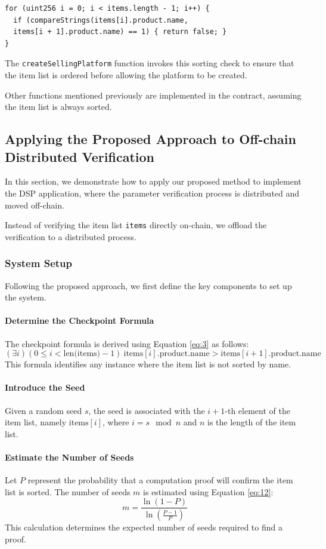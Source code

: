\documentclass[runningheads]{llncs}
\begin{document}
\begin{lstlisting}[numbers=none]
for (uint256 i = 0; i < items.length - 1; i++) {
  if (compareStrings(items[i].product.name, 
  items[i + 1].product.name) == 1) { return false; }
}
\end{lstlisting}

The \texttt{createSellingPlatform} function invokes this sorting check to ensure that the item list is ordered before allowing the platform to be created.

Other functions mentioned previously are implemented in the contract, assuming the item list is always sorted.
\subsection{Applying the Proposed Approach to Off-chain Distributed Verification}

In this section, we demonstrate how to apply our proposed method to implement the DSP application, where the parameter verification process is distributed and moved off-chain.

Instead of verifying the item list \texttt{items} directly on-chain, we offload the verification to a distributed process.

\subsubsection{System Setup}
Following the proposed approach, we first define the key components to set up the system.

\paragraph{Determine the Checkpoint Formula}
The checkpoint formula is derived using Equation \ref{eq:3} as follows:
\[
(\exists i) (0 \leq i < \text{len(items)} - 1) \ \text{items}[i].\text{product.name} > \text{items}[i+1].\text{product.name}
\]
This formula identifies any instance where the item list is not sorted by name.

\paragraph{Introduce the Seed}
Given a random seed \( s \), the seed is associated with the \( i+1 \)-th element of the item list, namely \( \text{items}[i] \), where \( i = s \mod n \) and \( n \) is the length of the item list.

\paragraph{Estimate the Number of Seeds}
Let \( P \) represent the probability that a computation proof will confirm the item list is sorted. The number of seeds \( m \) is estimated using Equation \ref{eq:12}:
\[
m = \frac{\ln(1 - P)}{\ln\left( \frac{P - 1}{P} \right)}
\]
This calculation determines the expected number of seeds required to find a proof.
\end{document}
